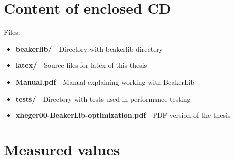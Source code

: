





\chapter{Content of enclosed CD}
\label{appendix:cd}
Files:
\begin{itemize}
  \item \textbf{beakerlib/} - Directory with beakerlib directory
  \item \textbf{latex/} - Source files for latex of this thesis
  \item \textbf{Manual.pdf} - Manual explaining working with BeakerLib
  \item \textbf{tests/} - Directory with tests used in performance testing
  \item \textbf{xheger00-BeakerLib-optimization.pdf} - PDF version of the thesis
\end{itemize}

\chapter{Measured values}
\label{appendix:data}

